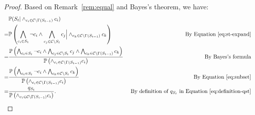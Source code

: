 \begin{lemma}
\begin{proof}
        Based on Remark~\ref{rem:equal} and Bayes's theorem, we have:
        \begin{equation} \label{eq:bayes}
            \begin{aligned}
                  & \mathbb{P}(S_t |\wedge_{c_i \in \mathcal{C}\backslash \Gamma(S_{t-1})}c_i) \nonumber                                                                                                                                                                                                                                                               \\
                = & \mathbb{P}\left(\bigwedge_{c_i \in S_t}\neg{c}_i \wedge \bigwedge_{c_j \in \mathcal{C}\backslash S_t}c_j \Big| \wedge_{c_k \in \mathcal{C}\backslash \Gamma(S_{t-1})}c_k \right)                                                                                        & \text{ By Equation~\eqref{eq:st-expand}}                                 \\
                = & \frac{\mathbb{P}\left(\bigwedge_{c_i \in S_t}\neg{c}_i \wedge \bigwedge_{c_j \in \mathcal{C}\backslash S_t}c_j \wedge \bigwedge_{c_k \in \mathcal{C}\backslash \Gamma(S_{t-1})}c_k \right)}{\mathbb{P} \left(\wedge_{c_i \in \mathcal{C}\backslash \Gamma(S_{t-1})}c_i\right) } & \text{By Bayes's formula}                                                \\
                = & \frac{\mathbb{P}\left(\bigwedge_{c_i \in S_t}\neg{c}_i \wedge \bigwedge_{c_k \in \mathcal{C}\backslash S_{t}}c_k \right)}{\mathbb{P} \left(\wedge_{c_i \in \mathcal{C}\backslash \Gamma(S_{t-1})}c_i\right) }                                                                   & \text{ By Equation~\eqref{eq:subset}}                                    \\
                = & \frac{q_{S_t} }{\mathbb{P} \left(\wedge_{c_i \in \mathcal{C}\backslash \Gamma(S_{t-1})}c_i\right) }.                                                                                                                                                                    & \text{ By definition of $q_{S_t}$ in Equation~\eqref{eq:definition-qst}}
            \end{aligned}
        \end{equation}


\end{proof}
\end{lemma}

